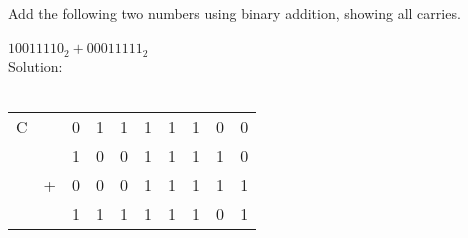 Add the following two numbers using binary addition, showing all carries. \\
\\
$10011110_2 + 00011111_2$ \\

Solution: \\
\\
\begin{tabular}{cccccccccc}
  C &   & 0 & 1 & 1 & 1 & 1 & 1 & 0 & 0 \\
    &   & 1 & 0 & 0 & 1 & 1 & 1 & 1 & 0 \\
    & + & 0 & 0 & 0 & 1 & 1 & 1 & 1 & 1 \\
  \hline
    &   & 1 & 1 & 1 & 1 & 1 & 1 & 0 & 1 \\
\end{tabular} \\
